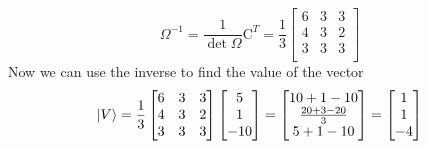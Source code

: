 \documentclass[../main.tex]{subfiles}
\begin{document}
\begin{equation*}
	\Omega^{-1}=\frac{1}{\det\Omega}\text{C}^T=\frac{1}{3}
	\begin{bmatrix}
		6 & 3 & 3 \\
		4 & 3 & 2 \\
		3 & 3 & 3 \\
	\end{bmatrix}
\end{equation*}
Now we can use the inverse to find the value of the vector
\begin{equation*}
	\ket{V}=\frac{1}{3}
	\begin{bmatrix}
		6 & 3 & 3 \\
		4 & 3 & 2 \\
		3 & 3 & 3 \\
	\end{bmatrix}
	\begin{bmatrix}
		5 \\
		1 \\
		-10
	\end{bmatrix}
	=\begin{bmatrix}
		10+1-10           \\
		\frac{20+3-20}{3} \\
		5+1-10            \\
	\end{bmatrix}
	=
	\begin{bmatrix}
		1 \\
		1 \\
		-4
	\end{bmatrix}
\end{equation*}
\end{document}
